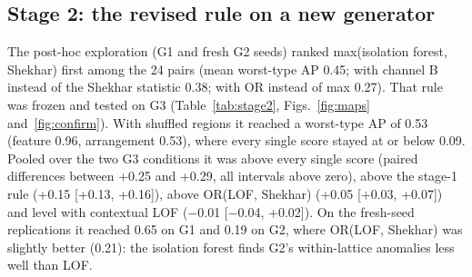 \documentclass[preprint,review,12pt]{elsarticle}
\begin{document}
\begin{table}[t]
\caption{Stage 1 (G2, three conditions pooled, 90 lattices): per-type AP, worst-type AP and the paired difference in worst-type AP of the frozen rule minus each comparator, with 95\% bootstrap interval.}
\label{tab:stage1}
\centering\footnotesize
{}
\end{table}

\subsection{Stage 2: the revised rule on a new generator}
The post-hoc exploration (G1 and fresh G2 seeds) ranked max(isolation forest, Shekhar) first among the 24 pairs (mean worst-type AP 0.45; with channel B instead of the Shekhar statistic 0.38; with OR instead of max 0.27). That rule was frozen and tested on G3 (Table~\ref{tab:stage2}, Figs.~\ref{fig:maps} and~\ref{fig:confirm}). With shuffled regions it reached a worst-type AP of 0.53 (feature 0.96, arrangement 0.53), where every single score stayed at or below 0.09. Pooled over the two G3 conditions it was above every single score (paired differences between +0.25 and +0.29, all intervals above zero), above the stage-1 rule (+0.15 [+0.13, +0.16]), above OR(LOF, Shekhar) (+0.05 [+0.03, +0.07]) and level with contextual LOF ($-$0.01 [$-$0.04, +0.02]). On the fresh-seed replications it reached 0.65 on G1 and 0.19 on G2, where OR(LOF, Shekhar) was slightly better (0.21): the isolation forest finds G2's within-lattice anomalies less well than LOF.
\end{document}
